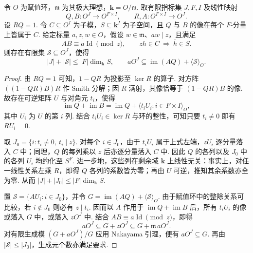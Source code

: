 \begin{lemma}[近似逆与额外生成元的秩界]
\label{lem:a-near-inverse-few-generators}
\emitthmsource
令 $O$ 为赋值环，$\mathfrak m$ 为其极大理想，$\mathbf k=O/\mathfrak m$. 取有限指标集 $J,F,I$ 及线性映射
\[
 Q,B:O^J\longrightarrow O^{F\times I},
 \qquad R,A:O^{F\times I}\longrightarrow O^J .
\]
设 $RQ=1$. 令 $C\subseteq O^I$ 为子模，$S\subseteq\mathbf k^I$ 为子空间，且 $Q$ 与 $B$ 的像在每个 $F$-分量上皆属于 $C$. 给定标量 $a,z,w\in O$，假设 $w\in\mathfrak m$、$aw\mid z$，且满足
\[
 AB\equiv a\operatorname{Id}\pmod z,\qquad
 zh\in C\ \Longrightarrow\ \overline h\in S .
\]
则存在有限集 $\mathcal S\subseteq O^J$，使得
\[
 |J|+|\mathcal S|\le |F|\dim_\mathbf kS,\qquad
 aO^J\subseteq \operatorname{im}(AQ)+\langle\mathcal S\rangle_O .
\]
\end{lemma}
\begin{proof}
由 $RQ=1$ 可知，$1-QR$ 为投影至 $\ker R$ 的算子. 对方阵 $((1-QR)B)R$ 作 Smith 分解；因 $R$ 满射，其像恰等于 $(1-QR)B$ 的像. 故存在可逆矩阵 $U$ 与对角元 $t_i$，使得
\[
 \operatorname{im}Q+\operatorname{im}B
   =\operatorname{im}Q+\big\langle t_iU_i:i\in F\times I\big\rangle_O ,
\]
其中 $U_i$ 为 $U$ 的第 $i$ 列. 结合 $t_iU_i\in\ker R$ 与环的整性，可知只要 $t_i\ne0$ 即有 $RU_i=0$.

取 $J_0=\{i:t_i\ne0,\ t_i\mid z\}$. 对每个 $i\in J_0$，由于 $t_iU_i$ 属于上式左端，$zU_i$ 逐分量落入 $C$ 中；同理，$Q$ 的每列乘以 $z$ 后亦逐分量落入 $C$ 中. 因此 $Q$ 的各列以及 $J_0$ 中的各列 $U_i$ 均约化至 $S^F$. 进一步地，这些列在剩余域 $\mathbf k$ 上线性无关：事实上，对任一线性关系左乘 $\overline R$，即得 $\overline Q$ 各列的系数皆为零；再由 $\overline U$ 可逆，推知其余系数亦全为零. 从而 $|J|+|J_0|\le |F|\dim_\mathbf kS$.

置 $\mathcal S=\{AU_i:i\in J_0\}$，并令 $G=\operatorname{im}(AQ)+\langle\mathcal S\rangle_O$. 由于赋值环中的整除关系可比较，若 $i\notin J_0$ 则必有 $z\mid t_i$. 因而以 $A$ 作用于 $\operatorname{im}Q+\operatorname{im}B$ 后，所有 $t_iU_i$ 的像或落入 $G$ 中，或落入 $zO^J$ 中. 结合 $AB\equiv a\operatorname{Id}\pmod z$，即得
\[
 aO^J\subseteq G+zO^J\subseteq G+\mathfrak m\,aO^J .
\]
对有限生成模 $(G+aO^J)/G$ 应用 Nakayama 引理，便有 $aO^J\subseteq G$. 再由 $|\mathcal S|\le|J_0|$，生成元个数亦满足要求.
\end{proof}

